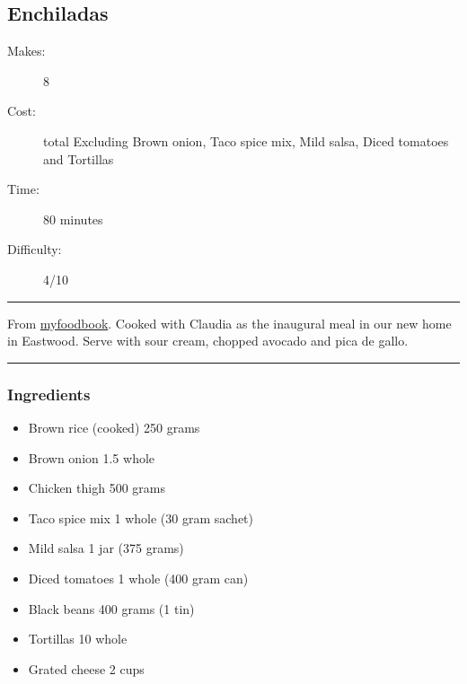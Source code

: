 \documentclass[]{article}
\begin{document}
\subsection*{\center\huge Enchiladas}
\begin{description}
\item[Makes:] 8 
\item[Cost:]  total Excluding Brown onion, Taco spice mix, Mild salsa, Diced tomatoes and Tortillas
\item[Time:] 80 minutes
\item[Difficulty:] 4/10
\end{description}
\vspace{0.2cm}\hrule\vspace{0.5cm}
\begin{adjustwidth}{0.5 cm}{0.5 cm}

From \href{https://myfoodbook.com.au/recipes/show/chicken-and-rice-enchiladas}{myfoodbook}. Cooked with Claudia as the inaugural meal in our new home in Eastwood. Serve with sour cream, chopped avocado and pica de gallo. \hfill{}\color{black}

\end{adjustwidth}
\vspace{0.5cm}\hrule
\subsubsection*{\Large Ingredients}
\begin{multicols}{2}
\begin{itemize}
 \item Brown rice (cooked) \hfill 250 grams
 \item Brown onion \hfill 1.5 whole
 \item Chicken thigh \hfill 500 grams
 \item Taco spice mix \hfill 1 whole (30 gram sachet)
 \item Mild salsa \hfill 1 jar (375 grams)
 \item Diced tomatoes \hfill 1 whole (400 gram can)
 \item Black beans \hfill 400 grams (1 tin)
 \item Tortillas \hfill 10 whole
 \item Grated cheese \hfill 2 cups
\end{itemize}
\end{multicols}
\end{document}
